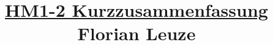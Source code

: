\title{\underline{HM1-2 Kurzzusammenfassung} \\ $\;$ \\ $\;$ \\ Florian Leuze}
\date{}
\maketitle %

$\;$ \newline
$\;$ \newline
$\;$ \newline
$\;$ \newline
$\;$ \newline
$\;$ \newline
$\;$ \newline
$\;$ \newline
$\;$ \newline
$\;$ \newline
$\;$ \newline
$\;$ \newline